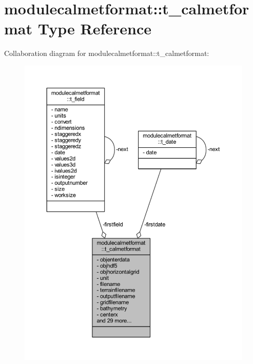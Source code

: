 \hypertarget{structmodulecalmetformat_1_1t__calmetformat}{}\section{modulecalmetformat\+:\+:t\+\_\+calmetformat Type Reference}
\label{structmodulecalmetformat_1_1t__calmetformat}


Collaboration diagram for modulecalmetformat\+:\+:t\+\_\+calmetformat\+:\nopagebreak
\begin{figure}[H]
\begin{center}
\leavevmode
\includegraphics[width=350pt]{structmodulecalmetformat_1_1t__calmetformat__coll__graph}
\end{center}
\end{figure}
